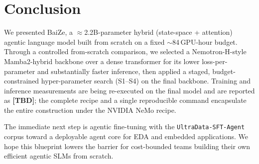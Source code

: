 \section{Conclusion}

We presented BaiZe, a $\approx$2.2B-parameter hybrid (state-space + attention) agentic language model built from scratch on a fixed $\sim$84\,GPU-hour budget.
Through a controlled from-scratch comparison, we selected a Nemotron-H-style Mamba2-hybrid backbone over a dense transformer for its lower loss-per-parameter and substantially faster inference, then applied a staged, budget-constrained hyper-parameter search (S1--S4) on the final backbone.
Training and inference measurements are being re-executed on the final model and are reported as \textbf{[TBD]}; the complete recipe and a single reproducible command encapsulate the entire construction under the NVIDIA NeMo recipe.

The immediate next step is agentic fine-tuning with the \texttt{UltraData-SFT-Agent} corpus toward a deployable agent core for EDA and embedded applications.
We hope this blueprint lowers the barrier for cost-bounded teams building their own efficient agentic SLMs from scratch.